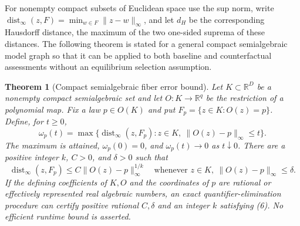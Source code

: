 \documentclass[11pt]{article}
\newtheorem{theorem}{Theorem}
\theoremstyle{remark}\newtheorem{remark}[theorem]{Remark}
\begin{document}
For nonempty compact subsets of Euclidean space use the sup norm, write
$\operatorname{dist}_\infty(z,F)=\min_{w\in F}\|z-w\|_\infty$, and let
$d_H$ be the corresponding Hausdorff distance, the maximum of the two
one-sided suprema of these distances. The following theorem is stated for
a general compact semialgebraic model graph so that it can be applied to
both baseline and counterfactual assessments without an equilibrium
selection assumption.

\begin{theorem}[Compact semialgebraic fiber error bound]\label{thm:modulus}
Let $K\subset\mathbb R^D$ be a nonempty compact semialgebraic set and let
$O:K\to\mathbb R^q$ be the restriction of a polynomial map. Fix a law
$p\in O(K)$ and put $F_p=\{z\in K:O(z)=p\}$. Define, for $t\geq0$,
\[
 \omega_p(t)=\max\{\operatorname{dist}_\infty(z,F_p):
                            z\in K,\ \|O(z)-p\|_\infty\leq t\}. \tag{5}
\]
The maximum is attained, $\omega_p(0)=0$, and $\omega_p(t)\to0$ as
$t\downarrow0$. There are a positive integer $k$, $C>0$, and $\delta>0$
such that
\[
 \operatorname{dist}_\infty(z,F_p)
       \leq C\|O(z)-p\|_\infty^{1/k}
 \quad\text{whenever }z\in K,\ \|O(z)-p\|_\infty\leq\delta. \tag{6}
\]
If the defining coefficients of $K,O$ and the coordinates of $p$ are
rational or effectively represented real algebraic numbers, an exact
quantifier-elimination procedure can certify positive rational $C,\delta$
and an integer $k$ satisfying (6). No efficient runtime bound is asserted.
\end{theorem}
\end{document}
